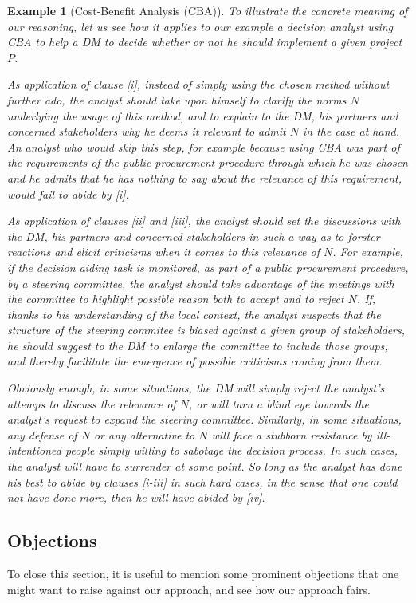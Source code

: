 \documentclass[preprint, french, english, 11pt, authoryear]{elsarticle}%
\newtheorem{example}{Example}
\begin{document}
\begin{example}[Cost-Benefit Analysis (CBA)]
To illustrate the concrete meaning of our reasoning, let us see how it applies to our example a decision analyst using CBA to help a \ac{DM} to decide whether or not he should implement a given project $P$.

As application of clause [i], instead of simply using the chosen method without further ado, the analyst should take upon himself to clarify the norms $N$ underlying the usage of this method, and to explain to the \ac{DM}, his partners and concerned stakeholders why he deems it relevant to admit $N$ in the case at hand. An analyst who would skip this step, for example because using CBA was part of the requirements of the public procurement procedure through which he was chosen and he admits that he has nothing to say about the relevance of this requirement, would fail to abide by [i].

As application of clauses [ii] and [iii], the analyst should set the discussions with the \ac{DM}, his partners and concerned stakeholders in such a way as to forster reactions and elicit criticisms when it comes to this relevance of $N$. For example, if the decision aiding task is monitored, as part of a public procurement procedure, by a steering committee, the analyst should take advantage of the meetings with the committee to highlight possible reason both to accept and to reject $N$. If, thanks to his understanding of the local context, the analyst suspects that the structure of the steering commitee is biased against a given group of stakeholders, he should suggest to the \ac{DM} to enlarge the committee to include those groups, and thereby facilitate the emergence of possible criticisms coming from them.

Obviously enough, in some situations, the \ac{DM} will simply reject the analyst's attemps to discuss the relevance of $N$, or will turn a blind eye towards the analyst's request to expand the steering committee. Similarly, in some situations, any defense of $N$ or any alternative to $N$ will face a stubborn resistance by ill-intentioned people simply willing to sabotage the decision process. In such cases, the analyst will have to surrender at some point. So long as the analyst has done his best to abide by clauses [i-iii] in such hard cases, in the sense that one could not have done more, then he will have abided by [iv].  
\end{example}

\subsection{Objections}
To close this section, it is useful to mention some prominent objections that one might want to raise against our approach, and see how our approach fairs.
\end{document}
